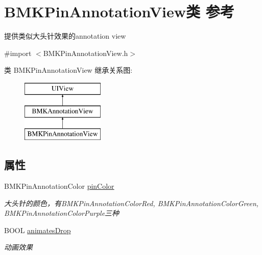 \hypertarget{interface_b_m_k_pin_annotation_view}{}\section{B\+M\+K\+Pin\+Annotation\+View类 参考}
\label{interface_b_m_k_pin_annotation_view}


提供类似大头针效果的annotation view  




{\ttfamily \#import $<$B\+M\+K\+Pin\+Annotation\+View.\+h$>$}

类 B\+M\+K\+Pin\+Annotation\+View 继承关系图\+:\begin{figure}[H]
\begin{center}
\leavevmode
\includegraphics[height=3.000000cm]{interface_b_m_k_pin_annotation_view}
\end{center}
\end{figure}
\subsection*{属性}
\begin{DoxyCompactItemize}
\item 
\hypertarget{interface_b_m_k_pin_annotation_view_a84f4c8db4dfa8d1d5a8ff6af8db7826d}{}B\+M\+K\+Pin\+Annotation\+Color \hyperlink{interface_b_m_k_pin_annotation_view_a84f4c8db4dfa8d1d5a8ff6af8db7826d}{pin\+Color}\label{interface_b_m_k_pin_annotation_view_a84f4c8db4dfa8d1d5a8ff6af8db7826d}

\begin{DoxyCompactList}\small\item\em 大头针的颜色，有\+B\+M\+K\+Pin\+Annotation\+Color\+Red, B\+M\+K\+Pin\+Annotation\+Color\+Green, B\+M\+K\+Pin\+Annotation\+Color\+Purple三种 \end{DoxyCompactList}\item 
\hypertarget{interface_b_m_k_pin_annotation_view_a0ea18aa3b2d71e06564bf11199d05625}{}B\+O\+O\+L \hyperlink{interface_b_m_k_pin_annotation_view_a0ea18aa3b2d71e06564bf11199d05625}{animates\+Drop}\label{interface_b_m_k_pin_annotation_view_a0ea18aa3b2d71e06564bf11199d05625}

\begin{DoxyCompactList}\small\item\em 动画效果 \end{DoxyCompactList}\end{DoxyCompactItemize}
